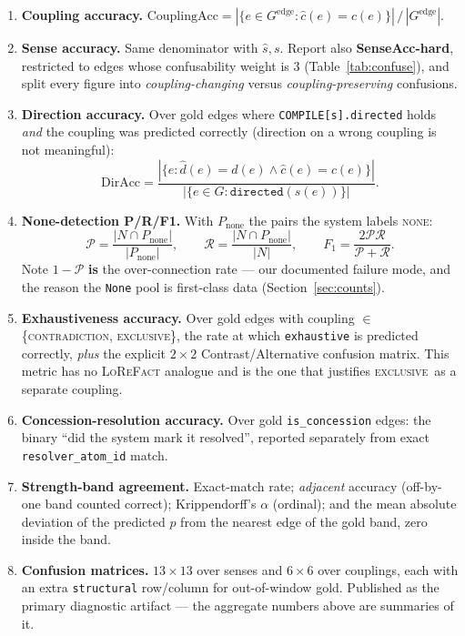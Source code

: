 \documentclass[11pt]{article}
\newcommand{\cCon}{\textsc{contradiction}}
\newcommand{\cExc}{\textsc{exclusive}}
\newcommand{\cNone}{\textsc{none}}
\begin{document}
\begin{enumerate}[leftmargin=*,nosep,label=\textbf{A\arabic*.}]
  \item \textbf{Coupling accuracy.}
        $\mathrm{CouplingAcc} = |\{e \in G^{\text{edge}} : \hat c(e) = c(e)\}| \,/\, |G^{\text{edge}}|$.
  \item \textbf{Sense accuracy.} Same denominator with $\hat s, s$. Report also
        \textbf{SenseAcc-hard}, restricted to edges whose confusability weight is 3
        (Table~\ref{tab:confuse}), and split every figure into
        \emph{coupling-changing} versus \emph{coupling-preserving} confusions.
  \item \textbf{Direction accuracy.} Over gold edges where
        \texttt{COMPILE[s].directed} holds \emph{and} the coupling was predicted correctly
        (direction on a wrong coupling is not meaningful):
        \[
          \mathrm{DirAcc} = \frac{|\{e : \hat d(e) = d(e) \wedge \hat c(e) = c(e)\}|}
                                 {|\{e \in G : \texttt{directed}(s(e))\}|}.
        \]
  \item \textbf{None-detection P/R/F1.} With $P_{\text{none}}$ the pairs the system labels
        \cNone:
        \[
          \mathcal{P} = \frac{|N \cap P_{\text{none}}|}{|P_{\text{none}}|}, \qquad
          \mathcal{R} = \frac{|N \cap P_{\text{none}}|}{|N|}, \qquad
          F_1 = \frac{2\mathcal{P}\mathcal{R}}{\mathcal{P}+\mathcal{R}}.
        \]
        Note $1 - \mathcal{P}$ \textbf{is} the over-connection rate --- our documented failure
        mode, and the reason the \texttt{None} pool is first-class data
        (Section~\ref{sec:counts}).
  \item \textbf{Exhaustiveness accuracy.} Over gold edges with coupling $\in$ \{\cCon, \cExc\},
        the rate at which \texttt{exhaustive} is predicted correctly, \emph{plus} the explicit
        $2\times2$ Contrast/Alternative confusion matrix. This metric has no \textsc{LoReFact}
        analogue and is the one that justifies \cExc\ as a separate coupling.
  \item \textbf{Concession-resolution accuracy.} Over gold \texttt{is\_concession} edges: the
        binary ``did the system mark it resolved'', reported separately from exact
        \texttt{resolver\_atom\_id} match.
  \item \textbf{Strength-band agreement.} Exact-match rate; \emph{adjacent} accuracy
        (off-by-one band counted correct); Krippendorff's $\alpha$ (ordinal); and the mean
        absolute deviation of the predicted $p$ from the nearest edge of the gold band, zero
        inside the band.
  \item \textbf{Confusion matrices.} $13\times13$ over senses and $6\times6$ over couplings,
        each with an extra \texttt{structural} row/column for out-of-window gold. Published as
        the primary diagnostic artifact --- the aggregate numbers above are summaries of it.
\end{enumerate}
\end{document}
